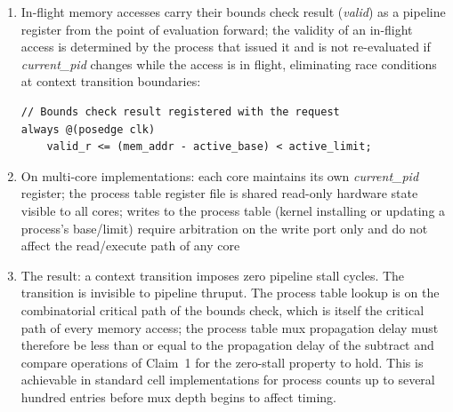 \documentclass[12pt,letterpaper]{article}
\begin{document}
\begin{enumerate}[label=(\alph*),noitemsep]
  \item In-flight memory accesses carry their bounds check result
        (\textit{valid}) as a pipeline register from the point of
        evaluation forward; the validity of an in-flight access is
        determined by the process that issued it and is not
        re-evaluated if \textit{current\_pid} changes while the
        access is in flight, eliminating race conditions at context
        transition boundaries:
        \begin{lstlisting}
// Bounds check result registered with the request
always @(posedge clk)
    valid_r <= (mem_addr - active_base) < active_limit;
        \end{lstlisting}

  \item On multi-core implementations: each core maintains its own
        \textit{current\_pid} register; the process table register
        file is shared read-only hardware state visible to all
        cores; writes to the process table (kernel installing or
        updating a process's base/limit) require arbitration on
        the write port only and do not affect the read/execute path
        of any core

  \item The result: a context transition imposes zero pipeline stall
        cycles. The transition is invisible to pipeline thruput.
        The process table lookup is on the combinatorial critical
        path of the bounds check, which is itself the critical path
        of every memory access; the process table mux propagation
        delay must therefore be less than or equal to the propagation
        delay of the subtract and compare operations of Claim~1 for
        the zero-stall property to hold. This is achievable in
        standard cell implementations for process counts up to
        several hundred entries before mux depth begins to affect
        timing.
\end{enumerate}
\end{document}
